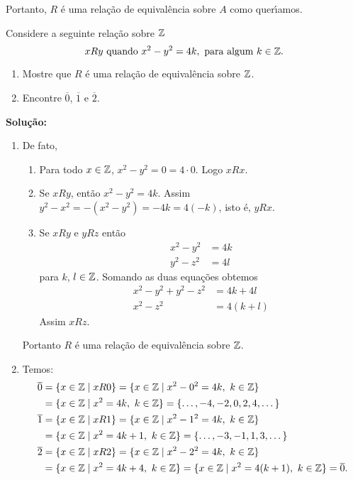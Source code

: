 \documentclass[12pt]{article}
\begin{document}
Portanto, $R$ \'e uma rela\c{c}\~ao de equival\^encia sobre $A$ como quer{\'\i}amos.

\vspace{.5cm}

\questao Considere a seguinte rela\c{c}\~ao sobre $\mathbb{Z}$
\[
	xRy \mbox{ quando } x^2 - y^2 = 4k, \mbox{ para algum } k \in \mathbb{Z}.
\]

\begin{enumerate}[label={\alph*})]
	\item Mostre que $R$ \'e uma rela{\c c}{\~a}o de equival{\^e}ncia sobre $\mathbb{Z}$.
	\item Encontre $\overline{0}$, $\overline{1}$ e $\overline{2}$.
\end{enumerate}

\noindent\textbf{Solu\c{c}\~ao:}
	\begin{enumerate}[label={\alph*})]
		\item De fato,
		\begin{enumerate}[label={\roman*})]
			\item Para todo $x \in \mathbb{Z}$, $x^2 - y^2 = 0 = 4\cdot 0$. Logo $xRx$.
			\item Se $xRy$, ent\~ao $x^2 - y^2 = 4k$. Assim $y^2 - x^2 = -(x^2 - y^2) = -4k = 4(-k)$, isto \'e, $yRx$.
			\item Se $xRy$ e $yRz$ ent\~ao
			\begin{align*}
				x^2 - y^2 &= 4k\\
				y^2 - z^2 &= 4l
			\end{align*}
			para $k$, $l \in \mathbb{Z}$.
			Somando as duas equa\c{c}\~oes obtemos
			\begin{align*}\label{terceira_equacao}
				x^2 - y^2 + y^2 - z^2 &= 4k + 4l\\
				x^2 - z^2 &= 4(k + l)
			\end{align*}
			Assim $xRz$.
		\end{enumerate}

		Portanto $R$ \'e uma rela\c{c}\~ao de equival\^encia sobre $\mathbb{Z}$.

		\item Temos:
		\begin{align*}
			\overline{0} &= \{x \in \mathbb{Z} \mid xR0\} = \{x \in \mathbb{Z} \mid x^2 - 0^2 = 4k,\ k \in \mathbb{Z}\} \\
			&= \{x \in \mathbb{Z} \mid x^2 = 4k, \ k \in \mathbb{Z}\} = \{\dots, -4,-2,0,2,4, \dots\}\\
			\overline{1} &= \{x \in \mathbb{Z} \mid xR1\} = \{x \in \mathbb{Z} \mid x^2 - 1^2 = 4k,\ k \in \mathbb{Z}\} \\
			&= \{x \in \mathbb{Z} \mid x^2 = 4k + 1, \ k \in \mathbb{Z}\} = \{\dots, -3,-1,1,3, \dots\}\\
			\overline{2} &= \{x \in \mathbb{Z} \mid xR2\} = \{x \in \mathbb{Z} \mid x^2 - 2^2 = 4k,\ k \in \mathbb{Z}\} \\
			&= \{x \in \mathbb{Z} \mid x^2 = 4k + 4, \ k \in \mathbb{Z}\} = \{x \in \mathbb{Z} \mid x^2 = 4(k + 1), \ k \in \mathbb{Z}\} = \overline{0}.
		\end{align*}
	\end{enumerate}
\end{document}
